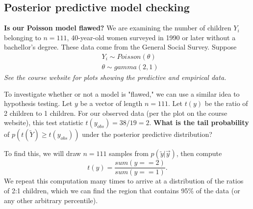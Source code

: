 \documentclass[titlepage, 12pt, leqno]{article}
\begin{document}
\subsection{Posterior predictive model checking}
\begin{ex}
    \textbf{Is our Poisson model flawed?} We are examining the number of 
    children $Y_{i}$ belonging to $n=111$, 40-year-old women surveyed in 1990
    or later without a bachellor's degree. These data come from the General
    Social Survey. Suppose
    \begin{align*}
        &Y_{i} \sim Poisson(\theta)\\
        &\theta \sim  gamma(2, 1)
    \end{align*}
    \textit{See the course website for plots showing the predictive and 
    empirical data.}

    To investigate whether or not a model is "flawed," we can use a similar
    idea to hypothesis testing. Let $y$ be a vector of length $n=111$. Let
    $t(y)$ be the ratio of 2 children to 1 children. For our observed data (per
    the plot on the course website), this test statistic $t(y_{obs}) = 38/19=2$.
    \textbf{What is the tail probability} of $p(t(\tilde Y) \ge t(y_{obs}))$
    under the posterior predictive distribution?

    To find this, we will draw $n=111$ samples from $p(\tilde y|\vec y)$, 
    then compute
    \[
    t(y) = \frac{sum(y ==2)}{sum(y==1)}.
    \]
    We repeat this computation many times to arrive at a distribution of the 
    ratios of 2:1 children, which we can find the region that contains 95\% of
    the data (or any other arbitrary percentile).
\end{ex}
\end{document}
